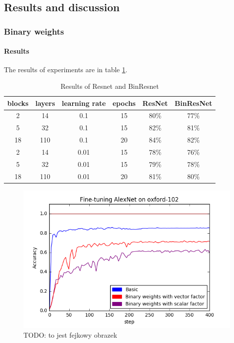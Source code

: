 \documentclass[licencjacka]{pracamgr}
\begin{document}
		\subsection{Results and discussion}
			\subsubsection{Binary weights}
		        \paragraph{Results} 
		     
		        The results of experiments are in table \ref{table:1}.
		        \begin{table}[H]
                    \caption{Results of Resnet and BinResnet}
                    \centering
                    \begin{tabular}{c c c c c c}
                    \hline\hline
                    blocks & layers & learning rate & epochs & ResNet & BinResNet  \\ [0.5ex]
                    \hline
                            2 & 14  & 0.1   & 15 & 80\% & 77\% \\
                            5 & 32  & 0.1   & 15 & 82\% & 81\% \\
                            18& 110 & 0.1   & 20 & 84\% & 82\%\\
                    \hline
                            2 & 14  & 0.01  & 15 & 78\% & 76\% \\
                            5 & 32  & 0.01  & 15 & 79\% & 78\% \\
                            18 & 110 & 0.01 & 20 & 81\% & 80\% \\
                    \hline
                    \end{tabular}
                    \label{table:1}
	            \end{table}
	            \begin{figure}[h]
				\centering
				\caption{TODO: to jest fejkowy obrazek}
				\includegraphics[width=\textwidth]{images/Fine-tuning-AlexNet}
			\end{figure}
\end{document}
